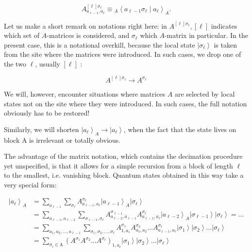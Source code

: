 \documentclass[12pt]{article}
\begin{document}
\begin{equation*}
A_{a_{\ell-1}, a_{\ell}}^{[\ell] \sigma_{\ell}} \equiv{ }_{A}\left\langle a_{\ell-1} \sigma_{\ell} \mid a_{\ell}\right\rangle_{A} . \tag{61}
\end{equation*}


Let us make a short remark on notations right here: in $A^{[\ell] \sigma_{\ell}},[\ell]$ indicates which set of $A$-matrices is considered, and $\sigma_{\ell}$ which $A$-matrix in particular. In the present case, this is a notational overkill, because the local state $\left|\sigma_{\ell}\right\rangle$ is taken from the site where the matrices were introduced. In such cases, we drop one of the two $\ell$, usually $[\ell]$ :


\begin{equation*}
A^{[\ell] \sigma_{\ell}} \rightarrow A^{\sigma_{\ell}} \tag{62}
\end{equation*}


We will, however, encounter situations where matrices $A$ are selected by local states not on the site where they were introduced. In such cases, the full notation obviously has to be restored!

Similarly, we will shorten $\left|a_{\ell}\right\rangle_{A} \rightarrow\left|a_{\ell}\right\rangle$, when the fact that the state lives on block A is irrelevant or totally obvious.

The advantage of the matrix notation, which contains the decimation procedure yet unspecified, is that it allows for a simple recursion from a block of length $\ell$ to the smallest, i.e. vanishing block. Quantum states obtained in this way take a very special form:


\begin{align*}
\left|a_{\ell}\right\rangle_{A} & =\sum_{a_{\ell-1}} \sum_{\sigma_{\ell}} A_{a_{\ell-1}, a_{\ell}}^{\sigma_{\ell}}\left|a_{\ell-1}\right\rangle_{A}\left|\sigma_{\ell}\right\rangle \\
& =\sum_{a_{\ell-1}, a_{\ell-2}} \sum_{\sigma_{\ell-1}, \sigma_{\ell}} A_{a_{\ell-2}, a_{\ell-1}}^{\sigma_{\ell-1}} A_{a_{\ell-1}, a_{\ell}}^{\sigma_{\ell}}\left|a_{\ell-2}\right\rangle_{A}\left|\sigma_{\ell-1}\right\rangle\left|\sigma_{\ell}\right\rangle=\ldots \\
& =\sum_{a_{1}, a_{2}, \ldots, a_{\ell-1}} \sum_{\sigma_{1}, \sigma_{2}, \ldots, \sigma_{\ell}} A_{1, a_{1}}^{\sigma_{1}} A_{a_{1}, a_{2}}^{\sigma_{2}} \ldots A_{a_{\ell-1}, a_{\ell}}^{\sigma_{\ell}}\left|\sigma_{1}\right\rangle\left|\sigma_{2}\right\rangle \ldots\left|\sigma_{\ell}\right\rangle \\
& =\sum_{\sigma_{i} \in \mathrm{A}}\left(A^{\sigma_{1}} A^{\sigma_{2}} \ldots A^{\sigma_{\ell}}\right)_{1, a_{\ell}}\left|\sigma_{1}\right\rangle\left|\sigma_{2}\right\rangle \ldots\left|\sigma_{\ell}\right\rangle \tag{63}
\end{align*}
\end{document}
